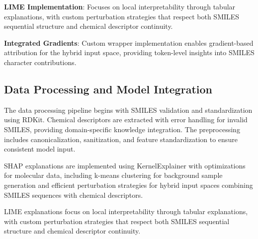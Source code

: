 \documentclass[preprint,12pt]{elsarticle}
\begin{document}
\textbf{LIME Implementation}: Focuses on local interpretability through tabular explanations, with custom perturbation strategies that respect both SMILES sequential structure and chemical descriptor continuity.

\textbf{Integrated Gradients}: Custom wrapper implementation enables gradient-based attribution for the hybrid input space, providing token-level insights into SMILES character contributions.

\subsection{Data Processing and Model Integration}


The data processing pipeline begins with SMILES validation and standardization using RDKit. Chemical descriptors are extracted with error handling for invalid SMILES, providing domain-specific knowledge integration. The preprocessing includes canonicalization, sanitization, and feature standardization to ensure consistent model input.



SHAP explanations are implemented using KernelExplainer with optimizations for molecular data, including k-means clustering for background sample generation and efficient perturbation strategies for hybrid input spaces combining SMILES sequences with chemical descriptors.


LIME explanations focus on local interpretability through tabular explanations, with custom perturbation strategies that respect both SMILES sequential structure and chemical descriptor continuity.

\end{document}
